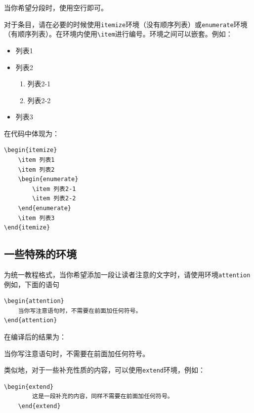 当你希望分段时，使用空行即可。

对于条目，请在必要的时候使用\verb|itemize|环境（没有顺序列表）或\verb|enumerate|环境（有顺序列表）。在环境内使用\verb|\item|进行编号。环境之间可以嵌套。例如：

\begin{itemize}
    \item 列表1
    \item 列表2
    \begin{enumerate}
        \item 列表2-1
        \item 列表2-2
    \end{enumerate}
    \item 列表3
\end{itemize}

在代码中体现为：

\begin{lstlisting}[frame=line]
\begin{itemize}
    \item 列表1
    \item 列表2
    \begin{enumerate}
        \item 列表2-1
        \item 列表2-2
    \end{enumerate}
    \item 列表3
\end{itemize}
\end{lstlisting}

\subsection{一些特殊的环境}\label{subsec:关于如何编写模板（教程）-一些特殊的环境}

为统一教程格式，当你希望添加一段让读者注意的文字时，请使用环境\verb|attention|例如，下面的语句

\begin{lstlisting}[frame=line]
\begin{attention}
    当你写注意语句时，不需要在前面加任何符号。
\end{attention}
\end{lstlisting}
在编译后的结果为：

\begin{attention}
    当你写注意语句时，不需要在前面加任何符号。
\end{attention}

类似地，对于一些补充性质的内容，可以使用\verb|extend|环境，例如：
\begin{lstlisting}[frame=line]
    \begin{extend}
        这是一段补充的内容，同样不需要在前面加任何符号。
    \end{extend}
\end{lstlisting}

